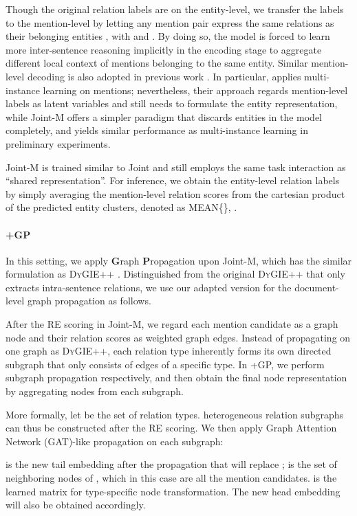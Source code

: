 \documentclass[11pt]{article}
\begin{document}
Though the original relation labels are on the entity-level, we transfer the labels to the mention-level by letting any mention pair  express the same relations as their belonging entities , with  and .
By doing so, the model is forced to learn more inter-sentence reasoning implicitly in the encoding stage to aggregate different local context of mentions belonging to the same entity.
Similar mention-level decoding is also adopted in previous work \cite{dwie,joint-mil}. In particular, \citet{joint-mil} applies multi-instance learning on mentions; nevertheless, their approach regards mention-level labels as latent variables and still needs to formulate the entity representation, while Joint-M offers a simpler paradigm that discards entities in the model completely, and yields similar performance as multi-instance learning in preliminary experiments.

Joint-M is trained similar to Joint and still employs the same task interaction as ``shared representation''.
For inference, we obtain the entity-level relation labels by simply averaging the mention-level relation scores from the cartesian product of the predicted entity clusters, denoted as  MEAN\{\}, .

\paragraph{+GP}
In this setting, we apply \textbf{G}raph \textbf{P}ropagation upon Joint-M, which has the similar formulation as D\textsc{y}GIE++ \citep{dygie++}. Distinguished from the original D\textsc{y}GIE++ that only extracts intra-sentence relations, we use our adapted version for the document-level graph propagation as follows.

After the RE scoring in Joint-M, we regard each mention candidate as a graph node and their relation scores as weighted graph edges. Instead of propagating on one graph as D\textsc{y}GIE++, each relation type inherently forms its own directed subgraph that only consists of edges of a specific type. In +GP, we perform subgraph propagation respectively, and then obtain the final node representation by aggregating nodes from each subgraph.

More formally, let  be the set of relation types.  heterogeneous relation subgraphs can thus be constructed after the RE scoring. We then apply Graph Attention Network (GAT)-like propagation \citep{gat} on each subgraph:

 is the new tail embedding after the propagation that will replace ;  is the set of neighboring nodes of , which in this case are all the mention candidates.  is the learned matrix for type-specific node transformation. The new head embedding  will also be obtained accordingly.
\end{document}
